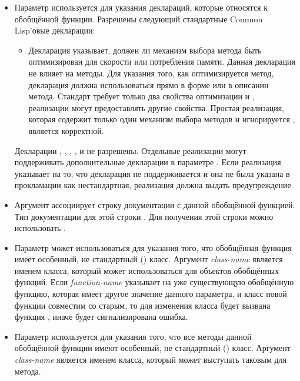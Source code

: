 \begin{defmac}
\begin{itemize}
\item 
Параметр  используется для указания деклараций, которые относятся к
обобщённой функции. Разрешены следующий стандартные Common Lisp'овые декларации:

\begin{itemize}

\item 
Декларация  указывает, должен ли механизм выбора метода
быть оптимизирован для скорости или потребления памяти. Данная декларация не
влияет на методы. Для указания того, как оптимизируется метод, декларация
 должна использоваться прямо в форме  или в
описании метода. Стандарт требует только два свойства оптимизации  и
, реализации могут предоставлять другие свойства. Простая реализация,
которая содержит только один механизм выбора методов и игнорируется
, является корректной.
\end{itemize}

Декларации , , , , 
 и  не разрешены.
Отдельные реализации могут поддерживать дополнительные декларации в параметре
. 
Если реализация указывает на то, что декларация не поддерживается и она не
была указана в прокламации  как нестандартная, реализация
должна выдать предупреждение.

\item
Аргумент  ассоциирует строку документации с данной обобщённой
функцией. Тип документации для этой строки . Для получения этой
строки можно использовать .

\item 
Параметр  может использоваться для указания того,
что обобщённая функция имеет особенный, не стандартный
() класс.
Аргумент \emph{class-name} является именем класса, который может использоваться
для объектов обобщённых функций. Если \emph{function-name} указывает на уже
существующую обобщённую функцию, которая имеет другое значение данного
параметра, и класс новой функции совместим со старым, то для изменения класса
будет вызвана функция , иначе будет сигнализирована ошибка.

\item 
Параметр  используется для указания того, что все методы
данной обобщённой функции имеют особенный, не стандартный
() класс. Аргумент \emph{class-name} является именем
класса, который может выступать таковым для метода.


\end{itemize}
\end{defmac}
